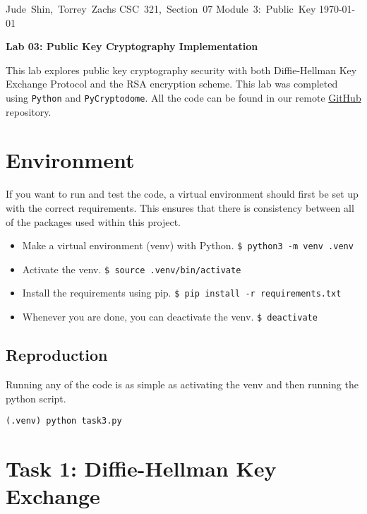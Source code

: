 \documentclass[11pt]{article}
\begin{document}
\hfill\vbox{\hbox{Jude Shin, Torrey Zachs}
		\hbox{CSC 321, Section 07}	
		\hbox{Module 3: Public Key}	
		\hbox{\today}}\par

\bigskip
\centerline{\Large\bf Lab 03: Public Key Cryptography Implementation}\par
\bigskip

This lab explores public key cryptography security with both Diffie-Hellman Key Exchange Protocol and the RSA encryption scheme. This lab was completed using {\tt Python} and {\tt PyCryptodome}. All the code can be found in our remote \href{https://github.com/jude-shin/CSC\_321}{GitHub} repository.

\section*{Environment}

If you want to run and test the code, a virtual environment should first be set up with the correct requirements. This ensures that there is consistency between all of the packages used within this project.

\begin{itemize}
	\item Make a virtual environment (venv) with Python.
		\verb|$ python3 -m venv .venv|
	\item Activate the venv.
		\verb|$ source .venv/bin/activate|
	\item Install the requirements using pip.
		\verb|$ pip install -r requirements.txt|
	\item Whenever you are done, you can deactivate the venv.
		\verb|$ deactivate|
\end{itemize}

\subsection*{Reproduction}

Running any of the code is as simple as activating the venv and then running the python script.

\verb|(.venv) python task3.py|

\section*{Task 1: Diffie-Hellman Key Exchange}
\end{document}
